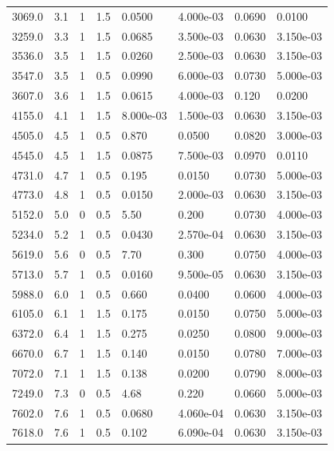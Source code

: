 \documentclass[preview]{standalone}
\begin{document}
{{\begin{tabular}{L{1.2cm}C{1.2cm} C{0.3cm}C{0.5cm} C{1.4cm}C{1.4cm} C{1.4cm}C{1.4cm}}
  3069.0  &   3.1  & 1     & 1.5 &  0.0500  & 4.000e-03  & 0.0690 &  0.0100   \\ 
  3259.0  &   3.3  & 1     & 1.5 &  0.0685  & 3.500e-03  & 0.0630 &  3.150e-03   \\ 
  3536.0  &   3.5  & 1     & 1.5 &  0.0260  & 2.500e-03  & 0.0630 &  3.150e-03   \\ 
  3547.0  &   3.5  & 1     & 0.5 &  0.0990  & 6.000e-03  & 0.0730 &  5.000e-03   \\ 
  3607.0  &   3.6  & 1     & 1.5 &  0.0615  & 4.000e-03  & 0.120 &  0.0200   \\ 
  4155.0  &   4.1  & 1     & 1.5 &  8.000e-03  & 1.500e-03  & 0.0630 &  3.150e-03   \\ 
  4505.0  &   4.5  & 1     & 0.5 &  0.870  & 0.0500  & 0.0820 &  3.000e-03   \\ 
  4545.0  &   4.5  & 1     & 1.5 &  0.0875  & 7.500e-03  & 0.0970 &  0.0110   \\ 
  4731.0  &   4.7  & 1     & 0.5 &  0.195  & 0.0150  & 0.0730 &  5.000e-03   \\ 
  4773.0  &   4.8  & 1     & 0.5 &  0.0150  & 2.000e-03  & 0.0630 &  3.150e-03   \\ 
  5152.0  &   5.0  & 0     & 0.5 &  5.50  & 0.200  & 0.0730 &  4.000e-03   \\ 
  5234.0  &   5.2  & 1     & 0.5 &  0.0430  & 2.570e-04  & 0.0630 &  3.150e-03   \\ 
  5619.0  &   5.6  & 0     & 0.5 &  7.70  & 0.300  & 0.0750 &  4.000e-03   \\ 
  5713.0  &   5.7  & 1     & 0.5 &  0.0160  & 9.500e-05  & 0.0630 &  3.150e-03   \\ 
  5988.0  &   6.0  & 1     & 0.5 &  0.660  & 0.0400  & 0.0600 &  4.000e-03   \\ 
  6105.0  &   6.1  & 1     & 1.5 &  0.175  & 0.0150  & 0.0750 &  5.000e-03   \\ 
  6372.0  &   6.4  & 1     & 1.5 &  0.275  & 0.0250  & 0.0800 &  9.000e-03   \\ 
  6670.0  &   6.7  & 1     & 1.5 &  0.140  & 0.0150  & 0.0780 &  7.000e-03   \\ 
  7072.0  &   7.1  & 1     & 1.5 &  0.138  & 0.0200  & 0.0790 &  8.000e-03   \\ 
  7249.0  &   7.3  & 0     & 0.5 &  4.68  & 0.220  & 0.0660 &  5.000e-03   \\ 
  7602.0  &   7.6  & 1     & 0.5 &  0.0680  & 4.060e-04  & 0.0630 &  3.150e-03   \\ 
  7618.0  &   7.6  & 1     & 0.5 &  0.102  & 6.090e-04  & 0.0630 &  3.150e-03   \\ 

\end{tabular}}}
\end{document}
